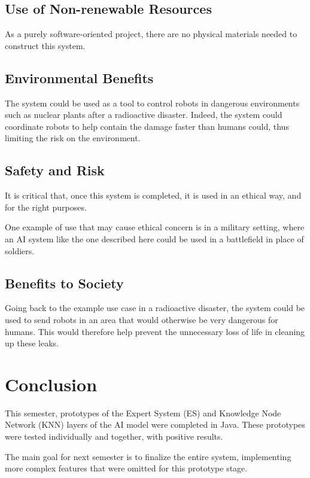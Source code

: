 \documentclass[titlepage,11pt]{article}
\begin{document}
\subsection{Use of Non-renewable Resources}

As a purely software-oriented project, there are no physical materials needed to construct this system.

\subsection{Environmental Benefits}

The system could be used as a tool to control robots in dangerous environments such as nuclear plants after a radioactive disaster. Indeed, the system could coordinate robots to help contain the damage faster than humans could, thus limiting the risk on the environment.

\subsection{Safety and Risk}

It is critical that, once this system is completed, it is used in an ethical way, and for the right purposes.

One example of use that may cause ethical concern is in a military setting, where an AI system like the one described here could be used in a battlefield in place of soldiers.

\subsection{Benefits to Society}

Going back to the example use case in a radioactive disaster, the system could be used to send robots in an area that would otherwise be very dangerous for humans. This would therefore help prevent the unnecessary loss of life in cleaning up these leaks.

\section{Conclusion}

This semester, prototypes of the Expert System (ES) and Knowledge Node Network (KNN) layers of the AI model were completed in Java. These prototypes were tested individually and together, with positive results.

The main goal for next semester is to finalize the entire system, implementing more complex features that were omitted for this prototype stage.

\clearpage

{}

\end{document}
